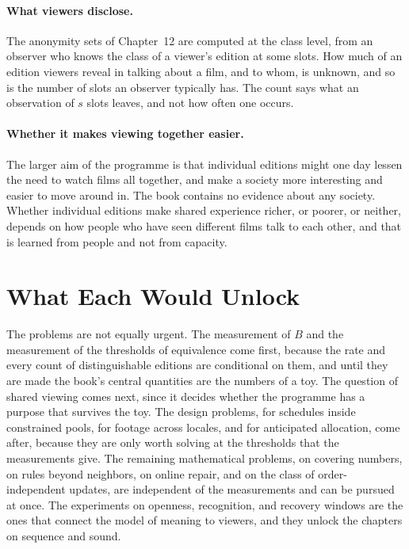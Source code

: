 \documentclass[11pt,twoside,openright]{book}
\theoremstyle{plain}
\theoremstyle{definition}
\theoremstyle{remark}
\begin{document}
\paragraph{What viewers disclose.} The anonymity sets of Chapter~12 are computed at the class level, from an observer who knows the class of a viewer's edition at some slots. How much of an edition viewers reveal in talking about a film, and to whom, is unknown, and so is the number of slots an observer typically has. The count says what an observation of $s$ slots leaves, and not how often one occurs.

\paragraph{Whether it makes viewing together easier.} The larger aim of the programme is that individual editions might one day lessen the need to watch films all together, and make a society more interesting and easier to move around in. The book contains no evidence about any society. Whether individual editions make shared experience richer, or poorer, or neither, depends on how people who have seen different films talk to each other, and that is learned from people and not from capacity.

\section{What Each Would Unlock}\label{sec:order18}

The problems are not equally urgent. The measurement of $B$ and the measurement of the thresholds of equivalence come first, because the rate and every count of distinguishable editions are conditional on them, and until they are made the book's central quantities are the numbers of a toy. The question of shared viewing comes next, since it decides whether the programme has a purpose that survives the toy. The design problems, for schedules inside constrained pools, for footage across locales, and for anticipated allocation, come after, because they are only worth solving at the thresholds that the measurements give. The remaining mathematical problems, on covering numbers, on rules beyond neighbors, on online repair, and on the class of order-independent updates, are independent of the measurements and can be pursued at once. The experiments on openness, recognition, and recovery windows are the ones that connect the model of meaning to viewers, and they unlock the chapters on sequence and sound.
\end{document}
